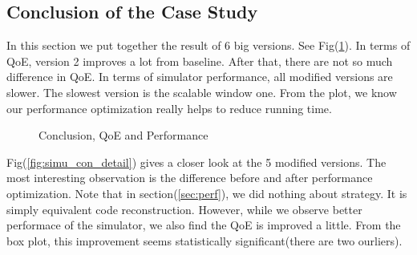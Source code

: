 \documentclass[11pt,a4paper]{article}
\begin{document}
\subsection{Conclusion of the Case Study}

In this section we put together the result of 6 big versions. 
See Fig(\ref{fig:simu_con}). In terms of QoE, version 2 improves
a lot from baseline. After that, there are not so much difference 
in QoE. In terms of simulator performance, all modified versions 
are slower. The slowest version is the scalable window one. From 
the plot, we know our performance optimization really helps to 
reduce running time. 

\begin{figure}[htb]
\centering
	\caption{Conclusion, QoE and Performance}
	\label{fig:simu_con}
\end{figure}

Fig(\ref{fig:simu_con_detail}) gives a closer look at the 5 modified versions. 
The most interesting observation is the difference before and after 
performance optimization. Note that in section(\ref{sec:perf}), 
we did nothing about strategy. It is simply equivalent code reconstruction.
However, while we observe better performace of the simulator, we also 
find the QoE is improved a little. From the box plot, this improvement 
seems statistically significant(there are two ourliers). 
\end{document}
